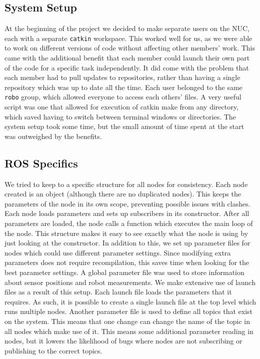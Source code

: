 \documentclass[10pt,a4paper,twocolumn]{article}
\begin{document}
\subsection{System Setup}
At the beginning of the project we decided to make separate users on the NUC,
each with a separate \texttt{catkin} workspace. This worked well for us, as we
were able to work on different versions of code without affecting other members'
work. This came with the additional benefit that each member could launch their
own part of the code for a specific task independently. It did come with the
problem that each member had to pull updates to repositories, rather than having
a single repository which was up to date all the time. Each user belonged to the
same \texttt{robo} group, which allowed everyone to access each others' files. A
very useful script was one that allowed for execution of catkin make from any
directory, which saved having to switch between terminal windows or directories.
The system setup took some time, but the small amount of time spent at
the start was outweighed by the benefits.

\subsection{ROS Specifics}
We tried to keep to a specific structure for all nodes for consistency. Each
node created is an object (although there are no duplicated nodes). This keeps
the parameters of the node in its own scope, preventing possible issues with
clashes. Each node loads parameters and sets up subscribers in its constructor.
After all parameters are loaded, the node calls a function which executes the
main loop of the node. This structure makes it easy to see exactly what the node
is using by just looking at the constructor. In addition to this, we set up
parameter files for nodes which could use different parameter settings. Since
modifying extra parameters does not require recompilation, this saves time when
looking for the best parameter settings. A global parameter file was used to
store information about sensor positions and robot measurements. We make
extensive use of launch files as a result of this setup. Each launch file loads
the parameters that it requires. As such, it is possible to create a single
launch file at the top level which runs multiple nodes. Another parameter file
is used to define all topics that exist on the system. This means that one
change can change the name of the topic in all nodes which make use of it. This
means some additional parameter reading in nodes, but it lowers the likelihood
of bugs where nodes are not subscribing or publishing to the correct topics.
\end{document}
